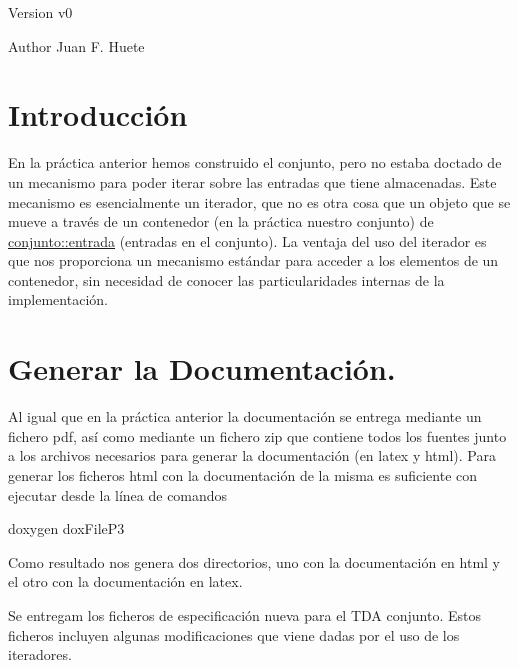 \begin{DoxyVersion}{Version}
v0 
\end{DoxyVersion}
\begin{DoxyAuthor}{Author}
Juan F. Huete
\end{DoxyAuthor}
\hypertarget{index_intro_sec}{}\section{Introducción}\label{index_intro_sec}
En la práctica anterior hemos construido el conjunto, pero no estaba doctado de un mecanismo para poder iterar sobre las entradas que tiene almacenadas. Este mecanismo es esencialmente un iterador, que no es otra cosa que un objeto que se mueve a través de un contenedor (en la práctica nuestro conjunto) de \hyperlink{classconjunto_a09cad766dd65de73e51eae21f9d22585}{conjunto\-::entrada} (entradas en el conjunto). La ventaja del uso del iterador es que nos proporciona un mecanismo estándar para acceder a los elementos de un contenedor, sin necesidad de conocer las particularidades internas de la implementación.\hypertarget{index_doc}{}\section{Generar la Documentación.}\label{index_doc}
Al igual que en la práctica anterior la documentación se entrega mediante un fichero pdf, así como mediante un fichero zip que contiene todos los fuentes junto a los archivos necesarios para generar la documentación (en latex y html). Para generar los ficheros html con la documentación de la misma es suficiente con ejecutar desde la línea de comandos


\begin{DoxyCode}
doxygen doxFileP3
\end{DoxyCode}


Como resultado nos genera dos directorios, uno con la documentación en html y el otro con la documentación en latex.

Se entregam los ficheros de especificación nueva para el T\-D\-A conjunto. Estos ficheros incluyen algunas modificaciones que viene dadas por el uso de los iteradores.

